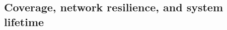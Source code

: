 \subsection{Coverage, network resilience, and system lifetime}
\label{section:coverage}


\newcommand{\varQualityMin}[2]{\epsilon}
\newcommand{\formalTasksSuccess}[2]{
	\functionFormal{success}
	{\setAtomicTask{}{}}
	{\setAtomicTask{}{'}}
}
\newcommand{\functionTasksSuccess}[2]{
\ifx&#1&%
	\functionSignature{success}{\setAtomicTask{}{}}
\else
	\functionSignature{success}{#1}
\fi
}

\newcommand{\formalCompositeTaskCoverage}[2]{
	\functionFormal{taskcov}
	{\setCompositeTask{}{}}
	{\setCompositeTask{}{'}}
}
\newcommand{\functionCompositeTaskCoverage}[2]{
	\functionSignature{taskcov}{\setCompositeTask{}{}}
}


